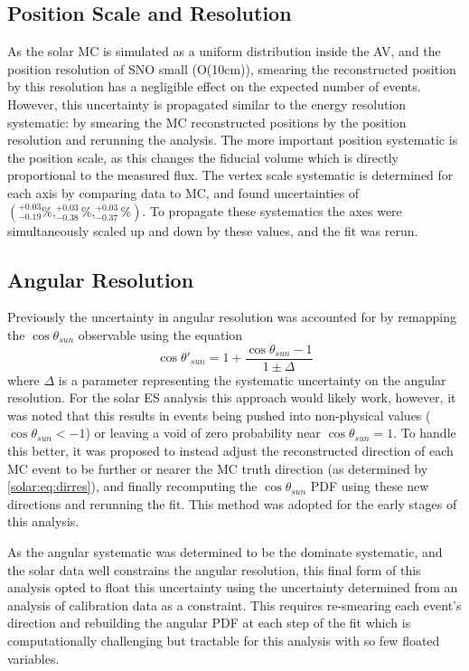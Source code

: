 \subsection{Position Scale and Resolution}

As the solar MC is simulated as a uniform distribution inside the AV, and the position resolution of SNO small (O(10cm)), smearing the reconstructed position by this resolution has a 
negligible effect on the expected number of events.
However, this uncertainty is propagated similar to the energy resolution systematic: by smearing the MC reconstructed positions by the position resolution and rerunning the analysis.
The more important position systematic is the position scale, as this changes the fiducial volume which is directly proportional to the measured flux.
The vertex scale systematic is determined for each axis by comparing \N data to MC, and found uncertainties of $(^{+0.03}_{-0.19}\%,^{+0.03}_{-0.38}\%,^{+0.03}_{-0.37}\%)$.
To propagate these systematics the axes were simultaneously scaled up and down by these values, and the fit was rerun.

\subsection{Angular Resolution}

Previously the uncertainty in angular resolution was accounted for by remapping the $\cos{\theta_{sun}}$ observable using the equation
\begin{equation}
\cos{\theta'_{sun}} = 1 + \frac{\cos{\theta_{sun}}-1}{1\pm\Delta}
\label{solar:eq:dirres}
\end{equation}
where $\Delta$ is a parameter representing the systematic uncertainty on the angular resolution.
For the solar ES analysis this approach would likely work, however, it was noted that this results in events being pushed into non-physical values ($\cos \theta_{sun} < -1$) or leaving a void of zero probability near $\cos \theta_{sun} = 1$.
To handle this better, it was proposed to instead adjust the reconstructed direction of each MC event to be further or nearer the MC truth direction (as determined by  \ref{solar:eq:dirres}), and finally recomputing the $\cos \theta_{sun}$ PDF using these new directions and rerunning the fit.
This method was adopted for the early stages of this analysis.

As the angular systematic was determined to be the dominate systematic, and the solar data well constrains the angular resolution, this final form of this analysis opted to float this uncertainty using the uncertainty determined from an analysis of \N calibration data as a constraint.
This requires re-smearing each event's direction and rebuilding the angular PDF at each step of the fit which is computationally challenging but tractable for this analysis with so few floated variables.

